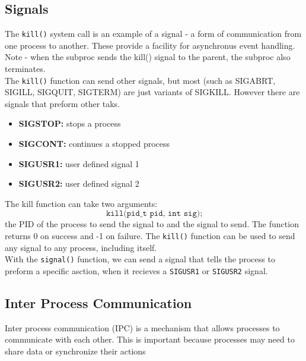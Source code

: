 \documentclass[a4paper, 10pt]{article}
\begin{document}
\subsection{Signals}
The \texttt{kill()} system call is an example of a signal - a form of communication from one process to another. These provide a facility for asynchronus event handling. Note - when the subproc sends the kill() signal to the parent, the subproc also terminates. \\[2ex]
The \texttt{kill()} function can send other signals, but most (such as SIGABRT, SIGILL, SIGQUIT, SIGTERM) are just variants of SIGKILL. However there are signals that preform other taks.
\begin{conceptbox}
    \begin{itemize}
        \item \textbf{SIGSTOP:} stops a process
        \item \textbf{SIGCONT:} continues a stopped process
        \item \textbf{SIGUSR1:} user defined signal 1
        \item \textbf{SIGUSR2:}  user defined signal 2
    \end{itemize}
\end{conceptbox}
The kill function can take two arguments:
$$\texttt{kill(pid\_t pid, int sig);}$$
the PID of the process to send the signal to and the signal to send. The function returns 0 on success and -1 on failure. The \texttt{kill()} function can be used to send any signal to any process, including itself. \\
With the \texttt{signal()} function, we can send a signal that tells the process to preform a specific asction, when it recieves a \texttt{SIGUSR1} or \texttt{SIGUSR2} signal.

\pagebreak

\subsection{Inter Process Communication}
Inter process communication (IPC) is a mechanism that allows processes to communicate with each other. This is important because processes may need to share data or synchronize their actions
\end{document}
